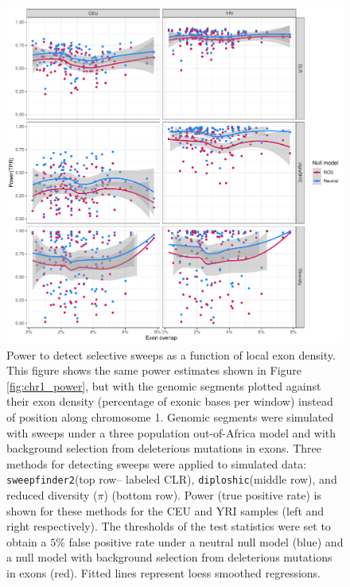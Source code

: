 \documentclass[hidelinks]{article}
\newcommand{\sweepfinder}{\texttt{sweepfinder2}\xspace}
\newcommand{\diploshic}{\texttt{diploshic}\xspace}
\begin{document}
\begin{figure}[h]
    \centering
    \includegraphics[width=0.8 \textwidth]{figures/sweeps/relationship_power_exon.pdf}
    \caption{
        Power to detect selective sweeps
        as a function of local exon density.
        This figure shows the same power estimates shown in Figure \ref{fig:chr1_power},
        but with the genomic segments plotted against their
        exon density (percentage of exonic bases per window) instead of position along chromosome 1.
    	Genomic segments were simulated with sweeps under a three population out-of-Africa model
        and with background selection from deleterious mutations in exons.
        Three methods for detecting sweeps were applied to simulated data:
        \sweepfinder (top row-- labeled CLR),
        \diploshic (middle row),
        and reduced diversity ($\pi$) (bottom row).
        Power (true positive rate) is shown for these methods for the CEU and YRI
        samples (left and right respectively).
        The thresholds of the test statistics were set to obtain a
        $5\%$ false positive rate under a neutral null model (blue)
        and a null model with background selection from deleterious mutations in exons (red).
        Fitted lines represent loess smoothed regressions.
    }
    \label{fig:power-exon}
\end{figure}
\end{document}
